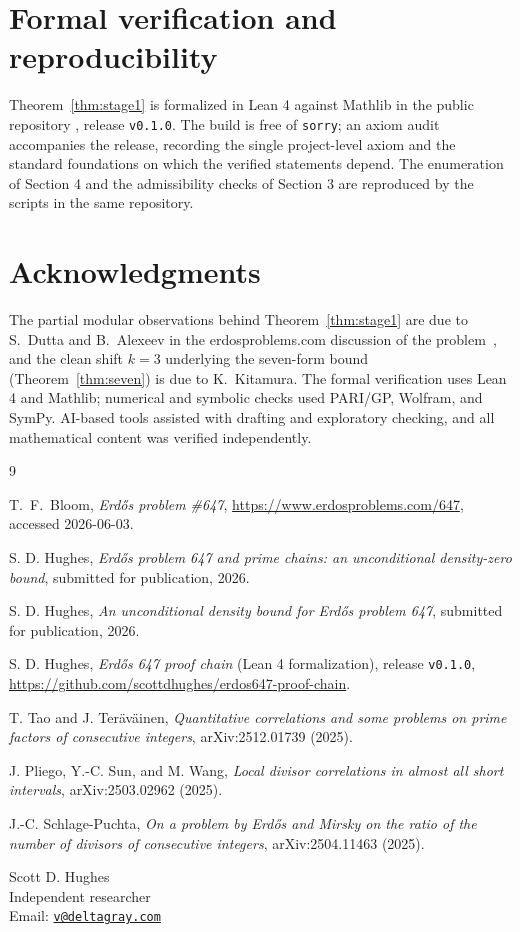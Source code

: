 \documentclass[11pt]{article}
\theoremstyle{remark}
\begin{document}
\section{Formal verification and reproducibility}

Theorem~\ref{thm:stage1} is formalized in Lean 4 against Mathlib in the public
repository \cite{ProofChain}, release \texttt{v0.1.0}. The build is free of
\texttt{sorry}; an axiom audit accompanies the release, recording the single
project-level axiom and the standard foundations on which the verified statements
depend. The enumeration of Section 4 and the admissibility checks of Section 3 are
reproduced by the scripts in the same repository.

\section*{Acknowledgments}

The partial modular observations behind Theorem~\ref{thm:stage1} are due to
S.~Dutta and B.~Alexeev in the erdosproblems.com discussion of the
problem~\cite{ErdosProblems647Forum}, and the clean shift $k=3$ underlying the
seven-form bound (Theorem~\ref{thm:seven}) is due to K.~Kitamura. The formal
verification uses Lean 4 and Mathlib; numerical and symbolic checks used PARI/GP,
Wolfram, and SymPy. AI-based tools assisted with drafting and exploratory checking,
and all mathematical content was verified independently.

\begin{thebibliography}{9}

T.~F.~Bloom,
\emph{Erd\H{o}s problem \#647},
\url{https://www.erdosproblems.com/647}, accessed 2026-06-03.

S. D. Hughes,
\emph{Erd\H{o}s problem 647 and prime chains: an unconditional density-zero bound},
submitted for publication, 2026.

S. D. Hughes,
\emph{An unconditional density bound for Erd\H{o}s problem 647},
submitted for publication, 2026.

S. D. Hughes,
\emph{Erd\H{o}s 647 proof chain} (Lean 4 formalization), release \texttt{v0.1.0},
\url{https://github.com/scottdhughes/erdos647-proof-chain}.

T. Tao and J. Ter\"av\"ainen,
\emph{Quantitative correlations and some problems on prime factors of consecutive
integers}, arXiv:2512.01739 (2025).

J. Pliego, Y.-C. Sun, and M. Wang,
\emph{Local divisor correlations in almost all short intervals},
arXiv:2503.02962 (2025).

J.-C. Schlage-Puchta,
\emph{On a problem by Erd\H{o}s and Mirsky on the ratio of the number of divisors of
consecutive integers}, arXiv:2504.11463 (2025).

\end{thebibliography}

\bigskip
\noindent
Scott D. Hughes\\
Independent researcher\\
Email: \href{mailto:v@deltagray.com}{\texttt{v@deltagray.com}}
\end{document}
